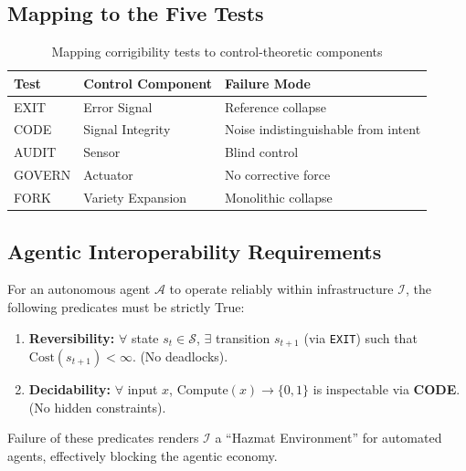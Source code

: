 \subsection{Mapping to the Five Tests}

\begin{table}[htbp]
\centering
\caption{Mapping corrigibility tests to control-theoretic components}
\label{tab:control-mapping}
\begin{tabular}{lll}
\hline
\textbf{Test} & \textbf{Control Component} & \textbf{Failure Mode} \\
\hline
EXIT & Error Signal & Reference collapse \\
CODE & Signal Integrity & Noise indistinguishable from intent \\
AUDIT & Sensor & Blind control \\
GOVERN & Actuator & No corrective force \\
FORK & Variety Expansion & Monolithic collapse \\
\hline
\end{tabular}
\end{table}

\subsection{Agentic Interoperability Requirements}

For an autonomous agent $\mathcal{A}$ to operate reliably within infrastructure $\mathcal{I}$, the following predicates must be strictly True:

\begin{enumerate}
    \item \textbf{Reversibility:} $\forall$ state $s_t \in \mathcal{S}$, $\exists$ transition $s_{t+1}$ (via \texttt{EXIT}) such that $\text{Cost}(s_{t+1}) < \infty$. (No deadlocks).
    \item \textbf{Decidability:} $\forall$ input $x$, $\text{Compute}(x) \to \{0,1\}$ is inspectable via \textbf{CODE}. (No hidden constraints).
\end{enumerate}

Failure of these predicates renders $\mathcal{I}$ a ``Hazmat Environment'' for automated agents, effectively blocking the agentic economy.


